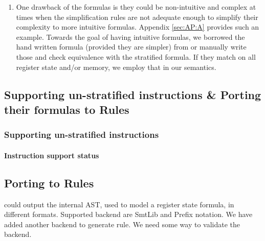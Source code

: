 {\begin{enumerate}
        
        \item One drawback of the \Strata formulas is they could be non-intuitive and
        complex at times when the simplification rules are not adequate enough to
        simplify their complexity to more intuitive formulas. Appendix \ref{sec:AP:A}
        provides such an example.  Towards the goal of having intuitive formulas, we
        borrowed the hand written formula (provided they are simpler) from \Stoke or
        manually write those  and check equivalence with the stratified formula. If they
        match on all register state and/or memory, we employ that in our \K semantics.
        
        
        
        
        
    \end{enumerate}
    
    \subsection{Supporting un-stratified instructions \& Porting their formulas to \K Rules}
    
    \subsubsection{Supporting un-stratified instructions}
    \paragraph{Instruction support status}
    
    
    
    \subsection{Porting to \K Rules}
    
    \Strata could output the internal AST, used to model a register state formula, in different
    formats. Supported backend are SmtLib and Prefix notation. We have added another backend 
    to generate \K rule. We need some way to validate the backend. 
    
}
